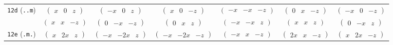 \documentclass[fleqn,9pt,landscape]{jsarticle}
\begin{document}
\begin{center}
\begin{longtable}{ccccccc}
{\tt 12d} ({\tt ..m}) & $ \begin{pmatrix} x & 0 & z \end{pmatrix} $ & $ \begin{pmatrix} - x & 0 & z \end{pmatrix} $ & $ \begin{pmatrix} x & 0 & - z \end{pmatrix} $ & $ \begin{pmatrix} - x & - x & - z \end{pmatrix} $ & $ \begin{pmatrix} 0 & x & - z \end{pmatrix} $ & $ \begin{pmatrix} - x & 0 & - z \end{pmatrix} $ \\
& $ \begin{pmatrix} x & x & - z \end{pmatrix} $ & $ \begin{pmatrix} 0 & - x & - z \end{pmatrix} $ & $ \begin{pmatrix} 0 & x & z \end{pmatrix} $ & $ \begin{pmatrix} - x & - x & z \end{pmatrix} $ & $ \begin{pmatrix} x & x & z \end{pmatrix} $ & $ \begin{pmatrix} 0 & - x & z \end{pmatrix} $ \\ \hline
{\tt 12e} ({\tt .m.}) & $ \begin{pmatrix} x & 2 x & z \end{pmatrix} $ & $ \begin{pmatrix} - x & - 2 x & z \end{pmatrix} $ & $ \begin{pmatrix} - x & - 2 x & - z \end{pmatrix} $ & $ \begin{pmatrix} - x & x & - z \end{pmatrix} $ & $ \begin{pmatrix} 2 x & x & - z \end{pmatrix} $ & $ \begin{pmatrix} x & 2 x & - z \end{pmatrix} $ \\

\end{longtable}
\end{center}
\end{document}
